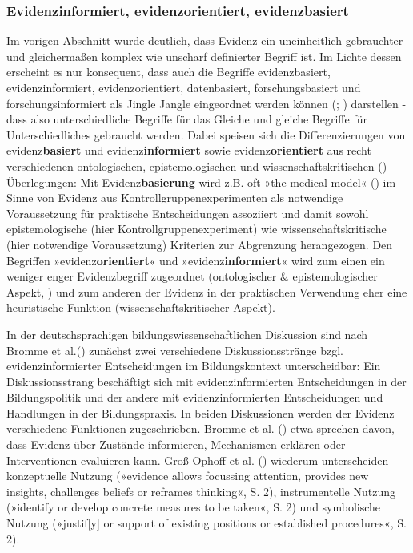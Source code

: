 \documentclass[
  jou,
  floatsintext,
  longtable,
  nolmodern,
  notxfonts,
  notimes,
  colorlinks=true,linkcolor=blue,citecolor=blue,urlcolor=blue]{apa7}
\begin{document}
\subsubsection{Evidenzinformiert, evidenzorientiert,
evidenzbasiert}\label{evidenzinformiert-evidenzorientiert-evidenzbasiert}

Im vorigen Abschnitt wurde deutlich, dass Evidenz ein uneinheitlich
gebrauchter und gleichermaßen komplex wie unscharf definierter Begriff
ist. Im Lichte dessen erscheint es nur konsequent, dass auch die
Begriffe evidenzbasiert, evidenzinformiert, evidenzorientiert,
datenbasiert, forschungsbasiert und forschungsinformiert als Jingle
Jangle eingeordnet werden können (; ) darstellen - dass
also unterschiedliche Begriffe für das Gleiche und gleiche Begriffe für
Unterschiedliches gebraucht werden. Dabei speisen sich die
Differenzierungen von evidenz\textbf{basiert} und
evidenz\textbf{informiert} sowie evidenz\textbf{orientiert} aus recht
verschiedenen ontologischen, epistemologischen und
wissenschaftskritischen () Überlegungen: Mit Evidenz\textbf{basierung} wird z.B. oft »the
medical model« () im Sinne von
Evidenz aus Kontrollgruppenexperimenten als notwendige Voraussetzung für
praktische Entscheidungen assoziiert und damit sowohl epistemologische
(hier Kontrollgruppenexperiment) wie wissenschaftskritische (hier
notwendige Voraussetzung) Kriterien zur Abgrenzung herangezogen. Den
Begriffen »evidenz\textbf{orientiert}« und »evidenz\textbf{informiert}«
wird zum einen ein weniger enger Evidenzbegriff zugeordnet
(ontologischer \& epistemologischer Aspekt,
) und zum anderen der Evidenz in der
praktischen Verwendung eher eine heuristische Funktion
(wissenschaftskritischer Aspekt).

In der deutschsprachigen bildungswissenschaftlichen Diskussion sind nach
Bromme et al.() zunächst zwei
verschiedene Diskussionsstränge bzgl. evidenzinformierter Entscheidungen
im Bildungskontext unterscheidbar: Ein Diskussionsstrang beschäftigt
sich mit evidenzinformierten Entscheidungen in der Bildungspolitik und
der andere mit evidenzinformierten Entscheidungen und Handlungen in der
Bildungspraxis. In beiden Diskussionen werden der Evidenz verschiedene
Funktionen zugeschrieben. Bromme et al.
() etwa sprechen davon, dass Evidenz
über Zustände informieren, Mechanismen erklären oder Interventionen
evaluieren kann. Groß Ophoff et al.
() wiederum unterscheiden
konzeptuelle Nutzung (»evidence allows focussing attention, provides new
insights, challenges beliefs or reframes thinking«, S. 2),
instrumentelle Nutzung (»identify or develop concrete measures to be
taken«, S. 2) und symbolische Nutzung (»justif{[}y{]} or support of
existing positions or established procedures«, S. 2).
\end{document}

